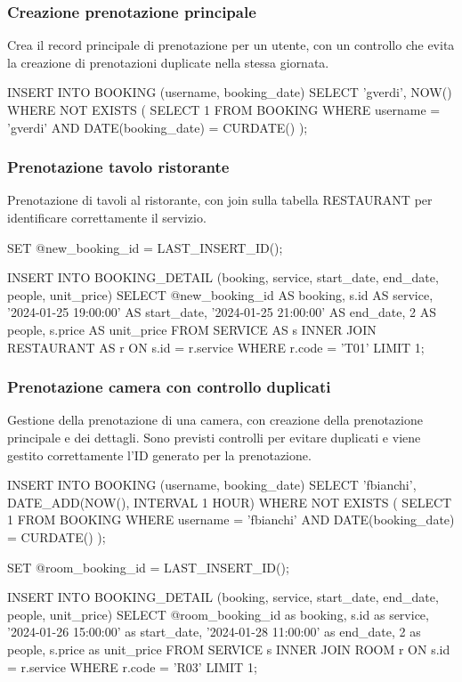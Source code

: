 \documentclass[a4paper,12pt]{report}
\begin{document}
\subsubsection{Creazione prenotazione principale}
Crea il record principale di prenotazione per un utente, con un
controllo che evita la creazione di prenotazioni duplicate nella
stessa giornata.

\begin{sqlcode}[caption={}]
INSERT INTO BOOKING (username, booking_date)
SELECT
  'gverdi',
  NOW()
WHERE NOT EXISTS (
  SELECT 1
  FROM BOOKING
  WHERE
    username = 'gverdi'
  AND DATE(booking_date) = CURDATE()
  );
\end{sqlcode}

\subsubsection{Prenotazione tavolo ristorante}
Prenotazione di tavoli al ristorante, con join sulla tabella
RESTAURANT per identificare correttamente il servizio.
\begin{sqlcode}[caption={}]
SET @new_booking_id = LAST_INSERT_ID();

INSERT INTO BOOKING_DETAIL (booking, service, start_date, end_date, people, unit_price)
SELECT
  @new_booking_id AS booking,
  s.id AS service,
  '2024-01-25 19:00:00' AS start_date,
  '2024-01-25 21:00:00' AS end_date,
  2 AS people,
  s.price AS unit_price
FROM SERVICE AS s
INNER JOIN RESTAURANT AS r ON s.id = r.service
WHERE r.code = 'T01'
LIMIT 1;
\end{sqlcode}

\newpage
\subsubsection{Prenotazione camera con controllo duplicati}
Gestione della prenotazione di una camera, con creazione della
prenotazione principale e dei dettagli. Sono previsti controlli per
evitare duplicati e viene gestito correttamente l'ID generato per la
prenotazione.

\begin{sqlcode}[caption={}]
INSERT INTO BOOKING (username, booking_date)
SELECT 'fbianchi', DATE_ADD(NOW(), INTERVAL 1 HOUR)
WHERE NOT EXISTS (
  SELECT 1 FROM BOOKING
  WHERE username = 'fbianchi'
  AND DATE(booking_date) = CURDATE()
);

SET @room_booking_id = LAST_INSERT_ID();

INSERT INTO BOOKING_DETAIL (booking, service, start_date, end_date, people, unit_price)
SELECT
  @room_booking_id as booking,
  s.id as service,
  '2024-01-26 15:00:00' as start_date,
  '2024-01-28 11:00:00' as end_date,
  2 as people,
  s.price as unit_price
FROM SERVICE s
INNER JOIN ROOM r ON s.id = r.service
WHERE r.code = 'R03'
LIMIT 1;
\end{sqlcode}
\end{document}
